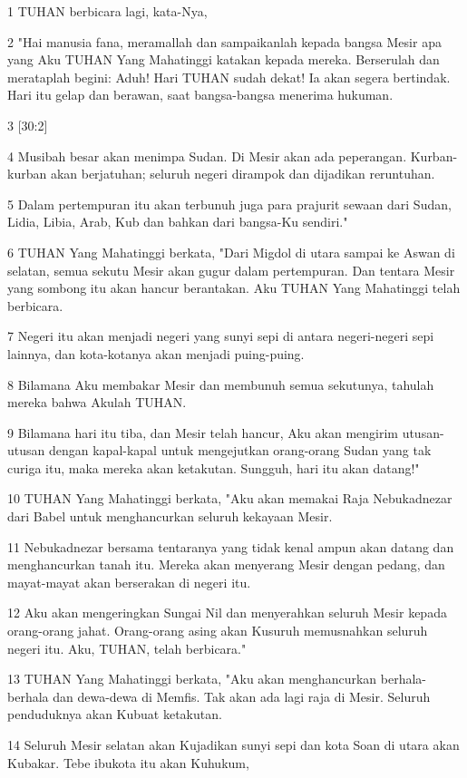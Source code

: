\par 1 TUHAN berbicara lagi, kata-Nya,
\par 2 "Hai manusia fana, meramallah dan sampaikanlah kepada bangsa Mesir apa yang Aku TUHAN Yang Mahatinggi katakan kepada mereka. Berserulah dan merataplah begini: Aduh! Hari TUHAN sudah dekat! Ia akan segera bertindak. Hari itu gelap dan berawan, saat bangsa-bangsa menerima hukuman.
\par 3 [30:2]
\par 4 Musibah besar akan menimpa Sudan. Di Mesir akan ada peperangan. Kurban-kurban akan berjatuhan; seluruh negeri dirampok dan dijadikan reruntuhan.
\par 5 Dalam pertempuran itu akan terbunuh juga para prajurit sewaan dari Sudan, Lidia, Libia, Arab, Kub dan bahkan dari bangsa-Ku sendiri."
\par 6 TUHAN Yang Mahatinggi berkata, "Dari Migdol di utara sampai ke Aswan di selatan, semua sekutu Mesir akan gugur dalam pertempuran. Dan tentara Mesir yang sombong itu akan hancur berantakan. Aku TUHAN Yang Mahatinggi telah berbicara.
\par 7 Negeri itu akan menjadi negeri yang sunyi sepi di antara negeri-negeri sepi lainnya, dan kota-kotanya akan menjadi puing-puing.
\par 8 Bilamana Aku membakar Mesir dan membunuh semua sekutunya, tahulah mereka bahwa Akulah TUHAN.
\par 9 Bilamana hari itu tiba, dan Mesir telah hancur, Aku akan mengirim utusan-utusan dengan kapal-kapal untuk mengejutkan orang-orang Sudan yang tak curiga itu, maka mereka akan ketakutan. Sungguh, hari itu akan datang!"
\par 10 TUHAN Yang Mahatinggi berkata, "Aku akan memakai Raja Nebukadnezar dari Babel untuk menghancurkan seluruh kekayaan Mesir.
\par 11 Nebukadnezar bersama tentaranya yang tidak kenal ampun akan datang dan menghancurkan tanah itu. Mereka akan menyerang Mesir dengan pedang, dan mayat-mayat akan berserakan di negeri itu.
\par 12 Aku akan mengeringkan Sungai Nil dan menyerahkan seluruh Mesir kepada orang-orang jahat. Orang-orang asing akan Kusuruh memusnahkan seluruh negeri itu. Aku, TUHAN, telah berbicara."
\par 13 TUHAN Yang Mahatinggi berkata, "Aku akan menghancurkan berhala-berhala dan dewa-dewa di Memfis. Tak akan ada lagi raja di Mesir. Seluruh penduduknya akan Kubuat ketakutan.
\par 14 Seluruh Mesir selatan akan Kujadikan sunyi sepi dan kota Soan di utara akan Kubakar. Tebe ibukota itu akan Kuhukum,
